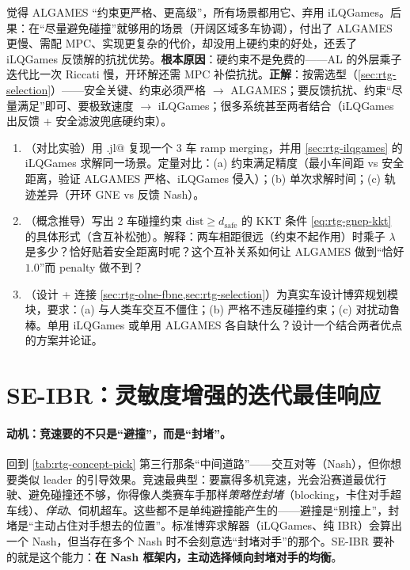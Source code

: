 \begin{pitfall}
觉得 ALGAMES “约束更严格、更高级”，所有场景都用它、弃用 iLQGames。后果：在“尽量避免碰撞”就够用的场景（开阔区域多车协调），付出了 ALGAMES 更慢、需配 MPC、实现更复杂的代价，却没用上硬约束的好处，还丢了 iLQGames 反馈解的抗扰优势。\textbf{根本原因}：硬约束不是免费的——AL 的外层乘子迭代比一次 Riccati 慢，开环解还需 MPC 补偿抗扰。\textbf{正解}：按需选型（\cref{sec:rtg-selection}）——安全关键、约束必须严格 $\to$ ALGAMES；要反馈抗扰、约束“尽量满足”即可、要极致速度 $\to$ iLQGames；很多系统甚至两者结合（iLQGames 出反馈 + 安全滤波兜底硬约束）。
\end{pitfall}

\begin{practice}
\begin{enumerate}
  \item （对比实验）用 \verb@Algames.jl@ 复现一个 3 车 ramp merging，并用 \cref{sec:rtg-ilqgames} 的 iLQGames 求解同一场景。定量对比：(a) 约束满足精度（最小车间距 vs 安全距离，验证 ALGAMES 严格、iLQGames 侵入）；(b) 单次求解时间；(c) 轨迹差异（开环 GNE vs 反馈 Nash）。
  \item （概念推导）写出 2 车碰撞约束 $\text{dist}\ge d_{\text{safe}}$ 的 KKT 条件 \cref{eq:rtg-gnep-kkt} 的具体形式（含互补松弛）。解释：两车相距很远（约束不起作用）时乘子 $\lambda$ 是多少？恰好贴着安全距离时呢？这个互补关系如何让 ALGAMES 做到“恰好 $1.0$”而 penalty 做不到？
  \item （设计 + 连接 \cref{sec:rtg-olne-fbne,sec:rtg-selection}）为真实车设计博弈规划模块，要求：(a) 与人类车交互不僵住；(b) 严格不违反碰撞约束；(c) 对扰动鲁棒。单用 iLQGames 或单用 ALGAMES 各自缺什么？设计一个结合两者优点的方案并论证。
\end{enumerate}
\end{practice}

\section{SE-IBR：灵敏度增强的迭代最佳响应}
\label{sec:rtg-seibr}

\paragraph{动机：竞速要的不只是“避撞”，而是“封堵”。}
回到 \cref{tab:rtg-concept-pick} 第三行那条“中间道路”——交互对等（Nash），但你想要类似 leader 的引导效果。竞速最典型：要赢得多机竞速，光会沿赛道最优行驶、避免碰撞还不够，你得像人类赛车手那样\emph{策略性封堵}（blocking，卡住对手超车线）、\emph{佯动}、伺机超车。这些都不是单纯避撞能产生的——避撞是“别撞上”，封堵是“主动占住对手想去的位置”。标准博弈求解器（iLQGames、纯 IBR）会算出一个 Nash，但当存在多个 Nash 时不会刻意选“封堵对手”的那个。SE-IBR 要补的就是这个能力：\textbf{在 Nash 框架内，主动选择倾向封堵对手的均衡}。


